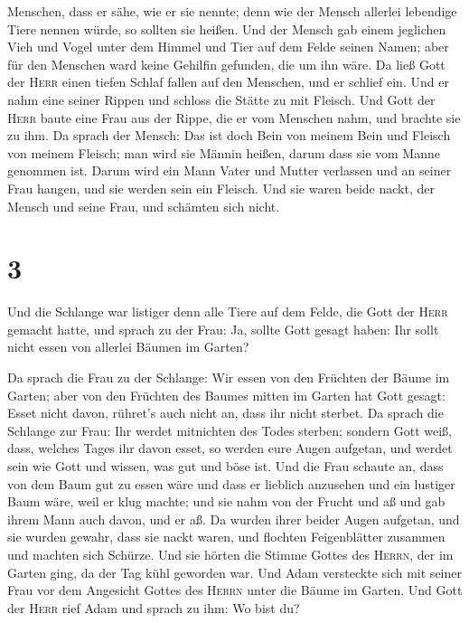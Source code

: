 Menschen, dass er sähe, wie er sie nennte; denn wie der Mensch allerlei
lebendige Tiere nennen würde, so sollten sie heißen.  Und
der Mensch gab einem jeglichen Vieh und Vogel unter dem Himmel und Tier
auf dem Felde seinen Namen; aber für den Menschen ward keine Gehilfin
gefunden, die um ihn wäre.  Da ließ Gott der
\textsc{Herr} einen tiefen Schlaf fallen auf den Menschen, und er
schlief ein. Und er nahm eine seiner Rippen und schloss die Stätte zu
mit Fleisch.  Und Gott der \textsc{Herr} baute eine Frau
aus der Rippe, die er vom Menschen nahm, und brachte sie zu ihm.
 Da sprach der Mensch: Das ist doch Bein von meinem Bein
und Fleisch von meinem Fleisch; man wird sie Männin heißen, darum dass
sie vom Manne genommen ist.  Darum wird ein Mann Vater
und Mutter verlassen und an seiner Frau hangen, und sie werden sein ein
Fleisch.  Und sie waren beide nackt, der Mensch und seine
Frau, und schämten sich nicht.

\hypertarget{section-2}{%
\section{3}\label{section-2}}

 Und die Schlange war listiger denn alle Tiere auf dem
Felde, die Gott der \textsc{Herr} gemacht hatte, und sprach zu der Frau:
Ja, sollte Gott gesagt haben: Ihr sollt nicht essen von allerlei Bäumen
im Garten?

 Da sprach die Frau zu der Schlange: Wir essen von den
Früchten der Bäume im Garten;  aber von den Früchten des
Baumes mitten im Garten hat Gott gesagt: Esset nicht davon, rühret's
auch nicht an, dass ihr nicht sterbet.  Da sprach die
Schlange zur Frau: Ihr werdet mitnichten des Todes sterben;
 sondern Gott weiß, dass, welches Tages ihr davon esset,
so werden eure Augen aufgetan, und werdet sein wie Gott und wissen, was
gut und böse ist.  Und die Frau schaute an, dass von dem
Baum gut zu essen wäre und dass er lieblich anzusehen und ein lustiger
Baum wäre, weil er klug machte; und sie nahm von der Frucht und aß und
gab ihrem Mann auch davon, und er aß.  Da wurden ihrer
beider Augen aufgetan, und sie wurden gewahr, dass sie nackt waren, und
flochten Feigenblätter zusammen und machten sich Schürze. 
Und sie hörten die Stimme Gottes des \textsc{Herrn}, der im Garten ging,
da der Tag kühl geworden war. Und Adam versteckte sich mit seiner Frau
vor dem Angesicht Gottes des \textsc{Herrn} unter die Bäume im Garten.
 Und Gott der \textsc{Herr} rief Adam und sprach zu ihm:
Wo bist du?

